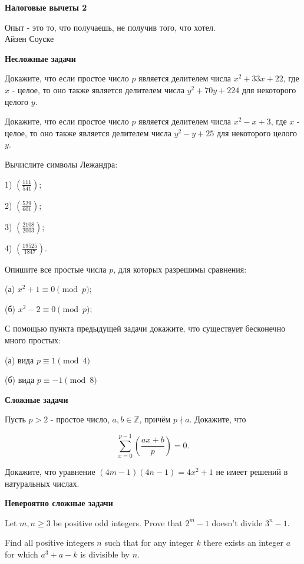 \centerline{\bf \Huge Налоговые вычеты 2}

\begin{flushright}
        \scriptsize{Опыт - это то, что получаешь, не получив того, что хотел.\\Айзен Соуске}
\end{flushright}

\textbf{\large Несложные задачи}

Докажите, что если простое число $p$ является делителем числа $x^2+ 33x+22$, где $x$ - целое, то оно также является делителем числа $y^2+70y+224$ для некоторого целого $y$.

Докажите, что если простое число $p$ является делителем числа $x^2-x+3$, где $x$ - целое, то оно также является делителем числа $y^2-y+25$ для некоторого целого $y$.

Вычислите символы Лежандра:

1) $\left(\frac{111}{541}\right)$;

2) $\left(\frac{529}{601}\right)$;

3) $\left(\frac{2108}{2003}\right)$;

4) $\left(\frac{19525}{1847}\right)$.

Опишите все простые числа $p$, для которых разрешимы сравнения:

(а) $x^2+1 \equiv 0 \pmod p;$

(б) $x^2-2 \equiv 0 \pmod p;$

С помощью пункта предыдущей задачи докажите, что существует бесконечно много простых:

(а) вида $p \equiv 1\pmod 4$

(б) вида $p \equiv -1\pmod 8$


\textbf{\large Сложные задачи}

Пусть $p>2$ - простое число, $a, b \in \mathbb{Z}$, причём $p \nmid a$. Докажите, что

$$
\sum_{x=0}^{p-1}\left(\frac{a x+b}{p}\right)=0 .
$$


\newpage

\hspace{3mm}
    
Докажите, что уравнение $(4 m-1)(4 n-1)=4 x^2+1$ не имеет решений в натуральных числах.


\textbf{\large Невероятно сложные задачи}

Let $m, n \geq 3$ be positive odd integers. Prove that $2^m-1$ doesn't divide $3^n-1$.


Find all positive integers $n$ such that for any integer $k$ there exists an integer $a$ for which $a^3+a-k$ is divisible by $n$.

